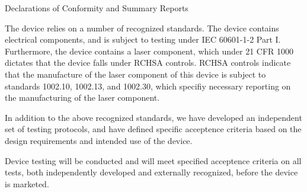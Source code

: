 \newpage
{}
\singlespacing
\begin{center}
  \large{Declarations of Conformity and Summary Reports}
\end{center}

\onehalfspacing

The device relies on a number of recognized standards. The device
contains electrical components, and is subject to testing under IEC
60601-1-2 Part I. Furthermore, the device contains a laser component,
which under 21 CFR 1000 dictates that the device falls under RCHSA
controls. RCHSA controls indicate that the manufacture of the laser
component of this device is subject to standards 1002.10, 1002.13, and
1002.30, which specifiy necessary reporting on the manufacturing of
the laser component. 

In addition to the above recognized standards, we have developed an
independent set of testing protocols, and have defined specific
acceptence criteria based on the design requirements and intended use
of the device.

Device testing will be conducted and will meet specified acceptence
criteria on all tests, both independently developed and externally
recognized, before the device is marketed.


